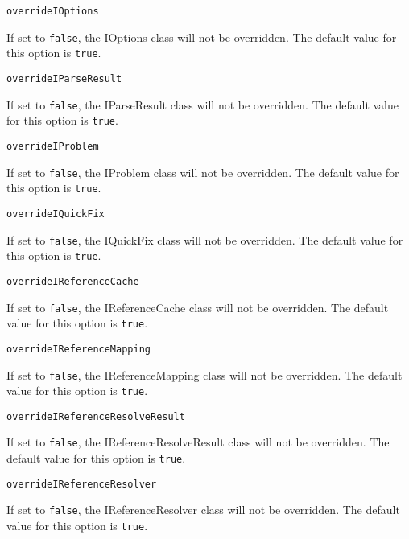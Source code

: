 \noindent\texttt{overrideIOptions}
\begin{myindentpar}{1cm}
If set to \texttt{false}, the IOptions class will not be overridden. The default value for this option is \texttt{true}.
\end{myindentpar}

\noindent\texttt{overrideIParseResult}
\begin{myindentpar}{1cm}
If set to \texttt{false}, the IParseResult class will not be overridden. The default value for this option is \texttt{true}.
\end{myindentpar}

\noindent\texttt{overrideIProblem}
\begin{myindentpar}{1cm}
If set to \texttt{false}, the IProblem class will not be overridden. The default value for this option is \texttt{true}.
\end{myindentpar}

\noindent\texttt{overrideIQuickFix}
\begin{myindentpar}{1cm}
If set to \texttt{false}, the IQuickFix class will not be overridden. The default value for this option is \texttt{true}.
\end{myindentpar}

\noindent\texttt{overrideIReferenceCache}
\begin{myindentpar}{1cm}
If set to \texttt{false}, the IReferenceCache class will not be overridden. The default value for this option is \texttt{true}.
\end{myindentpar}

\noindent\texttt{overrideIReferenceMapping}
\begin{myindentpar}{1cm}
If set to \texttt{false}, the IReferenceMapping class will not be overridden. The default value for this option is \texttt{true}.
\end{myindentpar}

\noindent\texttt{overrideIReferenceResolveResult}
\begin{myindentpar}{1cm}
If set to \texttt{false}, the IReferenceResolveResult class will not be overridden. The default value for this option is \texttt{true}.
\end{myindentpar}

\noindent\texttt{overrideIReferenceResolver}
\begin{myindentpar}{1cm}
If set to \texttt{false}, the IReferenceResolver class will not be overridden. The default value for this option is \texttt{true}.
\end{myindentpar}


